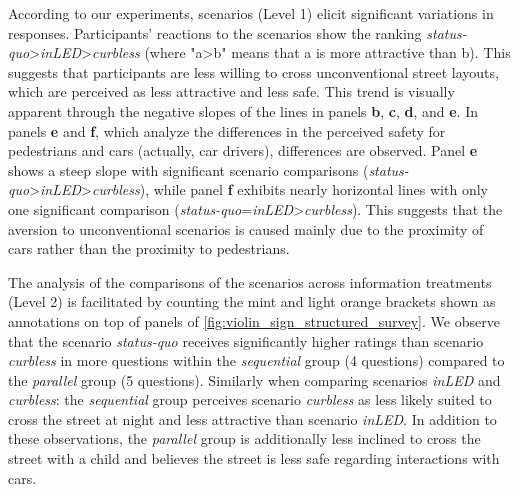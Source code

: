 According to our experiments, scenarios (Level 1) elicit significant variations in responses. Participants' reactions to the scenarios show the ranking \emph{status-quo}>\emph{inLED}>\emph{curbless} (where "a>b" means that a is more attractive than b). This suggests that participants are less willing to cross unconventional street layouts, which are perceived as less attractive and less safe. This trend is visually apparent through the negative slopes of the lines in panels \textbf{b}, \textbf{c}, \textbf{d}, and \textbf{e}.
In panels \textbf{e} and \textbf{f}, which analyze the differences in the perceived safety for pedestrians and cars (actually, car drivers), differences are observed. 
Panel \textbf{e} shows a steep slope with significant scenario comparisons (\emph{status-quo}>\emph{inLED}>\emph{curbless}), while panel \textbf{f} exhibits nearly horizontal lines with only one significant comparison (\emph{status-quo}=\emph{inLED}>\emph{curbless}). This suggests that the aversion to unconventional scenarios is caused mainly due to the proximity of cars rather than the proximity to pedestrians.

The analysis of the comparisons of the scenarios across information treatments (Level 2) is facilitated by counting the mint and light orange brackets shown as annotations on top of panels of \autoref{fig:violin_sign_structured_survey}. We observe that the scenario \emph{status-quo} receives significantly higher ratings than scenario \emph{curbless} in more questions within the \emph{sequential} group (4 questions) compared to the \emph{parallel} group (5 questions). 
Similarly when comparing scenarios \emph{inLED} and \emph{curbless}: the \emph{sequential} group perceives scenario \emph{curbless} as less likely suited to cross the street at night and less attractive than scenario \emph{inLED}. In addition to these observations, the \emph{parallel} group is additionally less inclined to cross the street with a child and believes the street is less safe regarding interactions with cars.

